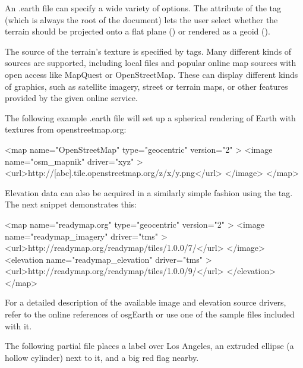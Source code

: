 An .earth file can specify a wide variety of options. The  attribute
of the  tag (which is always the root of the document) lets the user
select whether the terrain should be projected onto a flat plane
() or rendered as a geoid ().

The source of the terrain's texture is specified by  tags. Many
different kinds of sources are supported, including local files and popular
online map sources with open access like MapQuest or OpenStreetMap. These can
display different kinds of graphics, such as satellite imagery, street or
terrain maps, or other features provided by the given online service.

The following example .earth file will set up a spherical rendering of Earth
with textures from openstreetmap.org:

\begin{xml}
<map name="OpenStreetMap" type="geocentric" version="2" >
    <image name="osm_mapnik" driver="xyz" >
        <url>http://[abc].tile.openstreetmap.org/{z}/{x}/{y}.png</url>
    </image>
</map>
\end{xml}

Elevation data can also be acquired in a similarly simple fashion using the
 tag. The next snippet demonstrates this:

\begin{xml}
<map name="readymap.org" type="geocentric" version="2" >
    <image name="readymap_imagery" driver="tms" >
        <url>http://readymap.org/readymap/tiles/1.0.0/7/</url>
    </image>
    <elevation name="readymap_elevation" driver="tms" >
        <url>http://readymap.org/readymap/tiles/1.0.0/9/</url>
    </elevation>
</map>
\end{xml}

For a detailed description of the available image and elevation source drivers,
refer to the online references of osgEarth or use one of the sample  files
included with it.

The following partial  file places a label over Los Angeles, an extruded
ellipse (a hollow cylinder) next to it, and a big red flag nearby.

